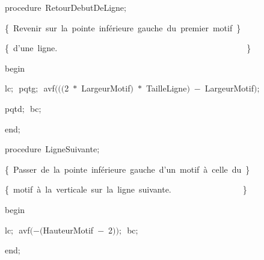 {\pagebreak[3] 
\vspace{\neglskip}\mbox{\blc  \blk\idt  \mcl procedure\idt \ RetourDebutDeLigne$;$}\par 
\vspace{\neglskip}\mbox{\blc  \blk\blk\idt  \cmt  \{\ Revenir\ sur\ la\ pointe\ inférieure\ gauche\ du\ premier\ motif\ \}\idt }\par 
\vspace{\neglskip}\mbox{\blc  \blk\blk\idt  \cmt  \{\ d{'}une\ ligne.\ \ \ \ \ \ \ \ \ \ \ \ \ \ \ \ \ \ \ \ \ \ \ \ \ \ \ \ \ \ \ \ \ \ \ \ \ \ \ \ \ \ \ \ \ \}\idt }\par 
\vspace{\neglskip}\mbox{\blc  \blk\idt  \mcl begin\idt }\par 
\vspace{\neglskip}\mbox{\blc  \blk\blk\idt  lc$;$\ pqtg$;$\ avf$($$($$($2\ $\ast$\ LargeurMotif$)$\ $\ast$\ TailleLigne$)$\ $-$\ LargeurMotif$)$$;$\ }\par 
\vspace{\neglskip}\mbox{\blc  \blk\blk\idt  pqtd$;$\ bc$;$\ }\par 
\vspace{\neglskip}\mbox{\blc  \blk\idt  \mcl end\idt $;$}\par 
\medskip

\pagebreak[3] 
\vspace{\neglskip}\mbox{\blc  \blk\idt  \mcl procedure\idt \ LigneSuivante$;$}\par 
\vspace{\neglskip}\mbox{\blc  \blk\blk\idt  \cmt  \{\ Passer\ de\ la\ pointe\ inférieure\ gauche\ d{'}un\ motif\ à\ celle\ du\ \}\idt }\par 
\vspace{\neglskip}\mbox{\blc  \blk\blk\idt  \cmt  \{\ motif\ à\ la\ verticale\ sur\ la\ ligne\ suivante.\ \ \ \ \ \ \ \ \ \ \ \ \ \ \ \ \ \}\idt }\par 
\vspace{\neglskip}\mbox{\blc  \blk\idt  \mcl begin\idt }\par 
\vspace{\neglskip}\mbox{\blc  \blk\blk\idt  lc$;$\ avf$($$-$$($HauteurMotif\ $-$\ 2$)$$)$$;$\ bc$;$\ }\par 
\vspace{\neglskip}\mbox{\blc  \blk\idt  \mcl end\idt $;$}\par 
\medskip

}
